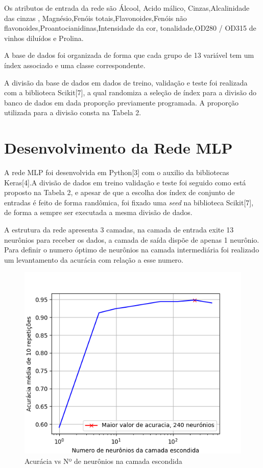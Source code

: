 Os atributos de entrada da rede são Álcool, Acido málico, Cinzas,Alcalinidade das cinzas , Magnésio,Fenóis totais,Flavonoides,Fenóis não flavonoides,Proantocianidinas,Intensidade da cor, tonalidade,OD280 / OD315 de vinhos diluídos e Prolina.

A base de dados foi organizada de forma que cada grupo de 13 variável tem um índex associado e uma classe correspondente.



 A divisão da base de dados em dados de treino, validação e teste foi realizada com a biblioteca Scikit[7], a qual randomiza a seleção de índex para a divisão do banco de dados em dada proporção previamente programada. A proporção utilizada para a divisão consta na Tabela 2.


 
\section{Desenvolvimento da Rede MLP}
A rede MLP foi desenvolvida em Python[3] com o auxilio da bibliotecas Keras[4].A divisão de dados em treino validação e teste foi seguido como está proposto na Tabela 2, e apesar de que a escolha dos índex de conjunto de entradas é feito de forma randômica, foi fixado uma \textit{seed} na biblioteca Scikit[7], de forma a sempre ser executada a mesma divisão de dados.

A estrutura da rede apresenta 3 camadas, na camada de entrada exite 13 neurônios para receber os dados, a camada de saída dispõe de apenas 1 neurônio. Para definir o numero óptimo de neurônios na camada intermediária foi realizado um levantamento da acurácia com relação a esse numero.

\begin{figure}[H]
\centering %
\includegraphics[width=\columnwidth]{04-Figuras/acuracia}
\caption{Acurácia vs Nº de neurônios na camada escondida}
\label{figura:acuracia}
\end{figure}

